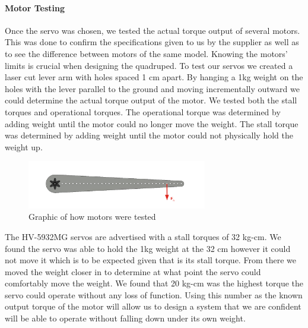             
            \paragraph{Motor Testing} \label{par:MotorTesting}
                Once the servo was chosen, we tested the actual torque output of several motors. This was done to confirm the specifications given to us by the supplier as well as to see the difference between motors of the same model. Knowing the motors' limits is crucial when designing the quadruped. To test our servos we created a laser cut lever arm with holes spaced 1 cm apart. By hanging a 1kg weight on the holes with the lever parallel to the ground and moving incrementally outward we could determine the actual torque output of the motor. We tested both the stall torques and operational torques. The operational torque was determined by adding weight until the motor could no longer move the weight. The stall torque was determined by adding weight until the motor could not physically hold the weight up.

                \begin{figure}[H]
                    \centering
                    \includegraphics[width=0.7\textwidth]{figures/MotorTestingDiagram.png}
                    \caption{Graphic of how motors were tested}
                    \label{fig:MotorTestingGraphic}
                \end{figure}

                The HV-5932MG servos are advertised with a stall torques of 32 kg-cm. We found the servo was able to hold the 1kg weight at the 32 cm however it could not move it which is to be expected given that is its stall torque. From there we moved the weight closer in to determine at what point the servo could comfortably move the weight. We found that 20 kg-cm was the highest torque the servo could operate without any loss of function. Using this number as the known output torque of the motor will allow us to design a system that we are confident will be able to operate without falling down under its own weight.


